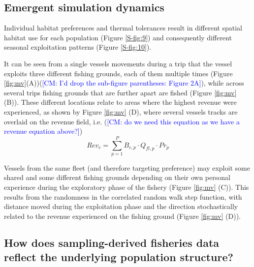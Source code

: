 \documentclass[review]{elsarticle}
\begin{document}
\subsection{Emergent simulation dynamics}

Individual habitat preferences and thermal tolerances result in different
spatial habitat use for each population (Figure \ref{S-fig:9}) and consequently
different seasonal exploitation patterns (Figure \ref{S-fig:10}). 

It can be seen from a single vessels movements during a trip that the vessel
exploits three different fishing grounds, each of them multiple times (Figure
\ref{fig:mv}(A))(\textcolor{blue}{[CM: I'd drop the sub-figure parentheses: Figure 2A]}), while across several trips fishing grounds that are further
apart are fished (Figure \ref{fig:mv} (B)). These different locations relate to
areas where the highest revenue were experienced, as shown by Figure
\ref{fig:mv} (D), where several vessels tracks are overlaid on the revenue
field, i.e. (\textcolor{blue}{[CM: do we need this equation as we have a revenue equation above?]}) $$Rev_{c} = \sum^P_{p=1} B_{c,p} \cdot Q_{fl,p} \cdot Pr_{p}$$

Vessels from the same fleet (and therefore targeting preference) may exploit
some shared and some different fishing grounds depending on their own personal
experience during the exploratory phase of the fishery (Figure \ref{fig:mv} (C)).
This results from the randomness in the correlated random walk step function,
with distance moved during the exploitation phase and the direction
stochastically related to the revenue experienced on the fishing ground (Figure
\ref{fig:mv} (D)). 

\subsection{How does sampling-derived fisheries data reflect the underlying
	population structure?}
\end{document}
